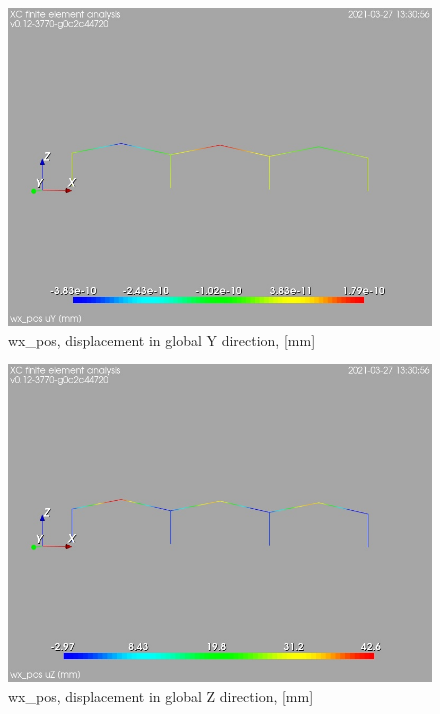 \begin{figure}
\begin{center}
\includegraphics[width=\linewidth]{calc_results/sole_zeinali/text/graphics/resSimplLC/wx_postotaluY}
\caption{wx_pos, displacement in global Y direction, [mm]}
\end{center}
\end{figure}
\begin{figure}
\begin{center}
\includegraphics[width=\linewidth]{calc_results/sole_zeinali/text/graphics/resSimplLC/wx_postotaluZ}
\caption{wx_pos, displacement in global Z direction, [mm]}
\end{center}
\end{figure}
